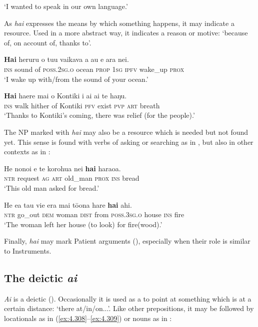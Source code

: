 \glt
‘I wanted to speak in our own language.’ \textstyleExampleref{[R201.002]} 
\z

As \textit{hai} expresses the means by which something happens, it may indicate a resource. Used in a more abstract way, it indicates a reason or motive: ‘because of, on account of, thanks to’.

\ea\label{ex:4.304}
\gll \textbf{Hai} heruru o tu{\ꞌ}u vaikava a au e {\ꞌ}ara nei. \\
\textsc{ins} sound of \textsc{poss.2sg.o} ocean \textsc{prop} \textsc{1sg} \textsc{ipfv} wake\_up \textsc{prox} \\

\glt 
‘I wake up with/from the sound of your ocean.’ \textstyleExampleref{[R474.002]} 
\z

\ea\label{ex:4.305}
\gll \textbf{Hai} ha{\ꞌ}ere mai o Kontiki i ai ai te haŋu. \\
\textsc{ins} walk hither of Kontiki \textsc{pfv} exist \textsc{pvp} \textsc{art} breath \\

\glt
‘Thanks to Kontiki’s coming, there was relief (for the people).’ \textstyleExampleref{[R376.077]} 
\z

The NP marked with \textit{hai} may also be a resource which is needed but not found yet. This sense is found with verbs of asking or searching as in , but also in other contexts as in :

\ea\label{ex:4.306}
\gll He nono{\ꞌ}i e te korohu{\ꞌ}a nei \textbf{hai} haraoa. \\
\textsc{ntr} request \textsc{ag} \textsc{art} old\_man \textsc{prox} \textsc{ins} bread \\

\glt 
‘This old man asked for bread.’ \textstyleExampleref{[R335.019]} 
\z

\ea\label{ex:4.307}
\gll He e{\ꞌ}a tau vi{\ꞌ}e era mai tō{\ꞌ}ona hare \textbf{hai} ahi.  \\
\textsc{ntr} go\_out \textsc{dem} woman \textsc{dist} from \textsc{poss.3sg.o} house \textsc{ins} fire  \\

\glt 
‘The woman left her house (to look) for fire(wood).’ \textstyleExampleref{[Mtx-7-35.013]}
\z

Finally, \textit{hai} may mark Patient arguments (), especially when their role is similar to Instruments.
\subsection{The deictic  \textit{{\ꞌ}ai}}\label{sec:4.7.10}
\textit{{\ꞌ}Ai} is a deictic  (). Occasionally it is used as a  to point at something which is at a certain distance: ‘there at/in/on...’. Like other prepositions, it may be followed by locationals as in (\ref{ex:4.308}–\ref{ex:4.309}) or nouns as in :

